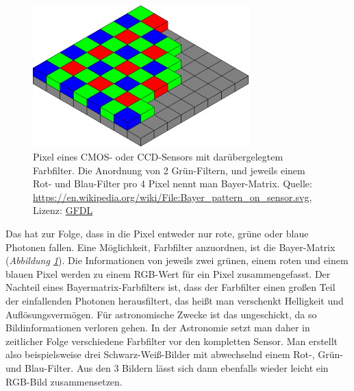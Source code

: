 \documentclass[10pt,a4paper,titlepage]{article}
\begin{document}
\begin{figure}[h!]
  \centering
    \includegraphics[width=0.75\textwidth]{Bayer-Matrix}
  \caption{Pixel eines CMOS- oder CCD-Sensors mit darübergelegtem Farbfilter. Die Anordnung von 2 Grün-Filtern, und jeweils einem Rot- und Blau-Filter pro 4 Pixel nennt man Bayer-Matrix. Quelle: \url{https://en.wikipedia.org/wiki/File:Bayer_pattern_on_sensor.svg}, Lizenz: \href{http://www.selflinux.org/selflinux/html/gfdl_de.html}{GFDL}}
  \label{fig:bayermatrix}
\end{figure}
Das hat zur Folge, dass in die Pixel entweder nur rote, grüne oder blaue Photonen fallen. Eine Möglichkeit, Farbfilter anzuordnen, ist die Bayer-Matrix (\textit{Abbildung \ref{fig:bayermatrix}}). Die Informationen von jeweils zwei grünen, einem roten und einem blauen Pixel werden zu einem RGB-Wert für ein Pixel zusammengefasst. Der Nachteil eines Bayermatrix-Farbfilters ist, dass der Farbfilter einen großen Teil der einfallenden Photonen herausfiltert, das heißt man verschenkt Helligkeit und Auflösungsvermögen. Für astronomische Zwecke ist das ungeschickt, da so Bildinformationen verloren gehen. In der Astronomie setzt man daher in zeitlicher Folge verschiedene Farbfilter vor den kompletten Sensor. Man erstellt also beispielsweise drei Schwarz-Weiß-Bilder mit abwechselnd einem Rot-, Grün- und Blau-Filter. Aus den 3 Bildern lässt sich dann ebenfalls wieder leicht ein RGB-Bild zusammensetzen.

\noindent{}
\end{document}
